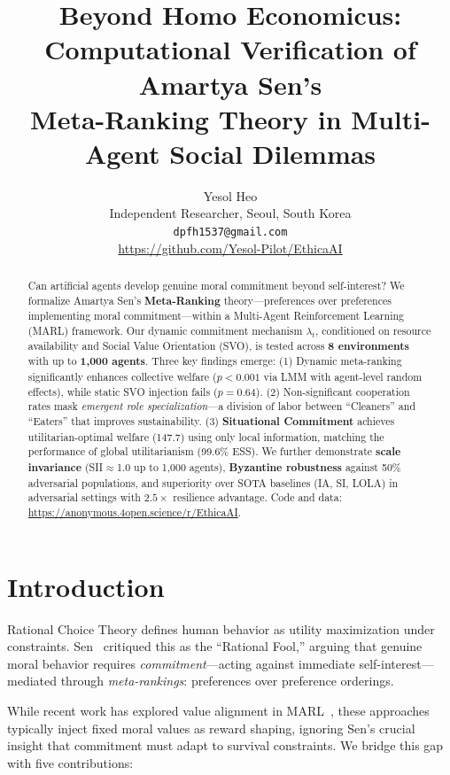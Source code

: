 \documentclass{article}
\title{Beyond Homo Economicus: Computational Verification of Amartya Sen's\\
Meta-Ranking Theory in Multi-Agent Social Dilemmas}
\author{
  Yesol Heo \\
  Independent Researcher, Seoul, South Korea \\
  \texttt{dpfh1537@gmail.com} \\
  \url{https://github.com/Yesol-Pilot/EthicaAI}
}
\begin{document}
\maketitle

\begin{abstract}
Can artificial agents develop genuine moral commitment beyond self-interest?
We formalize Amartya Sen's \textbf{Meta-Ranking} theory---preferences over preferences implementing moral commitment---within a Multi-Agent Reinforcement Learning (MARL) framework.
Our dynamic commitment mechanism $\lambda_t$, conditioned on resource availability and Social Value Orientation (SVO), is tested across \textbf{8 environments} with up to \textbf{1,000 agents}.
Three key findings emerge:
(1) Dynamic meta-ranking significantly enhances collective welfare ($p{<}0.001$ via LMM with agent-level random effects), while static SVO injection fails ($p{=}0.64$).
(2) Non-significant cooperation rates mask \emph{emergent role specialization}---a division of labor between ``Cleaners'' and ``Eaters'' that improves sustainability.
(3) \textbf{Situational Commitment} achieves utilitarian-optimal welfare (147.7) using only local information, matching the performance of global utilitarianism (99.6\% ESS).
We further demonstrate \textbf{scale invariance} (SII$\approx$1.0 up to 1,000 agents), \textbf{Byzantine robustness} against 50\% adversarial populations, and superiority over SOTA baselines (IA, SI, LOLA) in adversarial settings with $2.5\times$ resilience advantage.
Code and data: \url{https://anonymous.4open.science/r/EthicaAI}.
\end{abstract}

\section{Introduction}

Rational Choice Theory defines human behavior as utility maximization under constraints.
Sen~\cite{sen1977rational} critiqued this as the ``Rational Fool,'' arguing that genuine moral behavior requires \textit{commitment}---acting against immediate self-interest---mediated through \textit{meta-rankings}: preferences over preference orderings.

While recent work has explored value alignment in MARL~\cite{rodriguez2021multi,christoffersen2023get}, these approaches typically inject fixed moral values as reward shaping, ignoring Sen's crucial insight that commitment must adapt to survival constraints.
We bridge this gap with five contributions:
\end{document}
